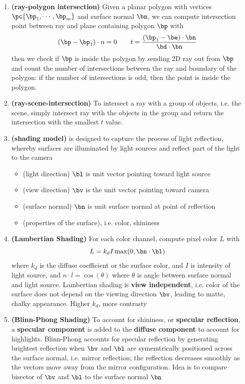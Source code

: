 \documentclass[11pt]{article}
\newcommand{\heading}[1]{(#1)}
\newcommand{\bheading}[1]{\textbf{(#1)}}
\begin{document}
\begin{enumerate}
    \item \bheading{ray-polygon intersection} Given a planar polygon with vertices $\pc{\bp_1, \cdots, \bp_m}$ and surface normal $\bn$, we can compute intersection point between ray and plane containing polygon $\bp$ with 
    \[
        (\bp - \bp_1) \cdot n = 0
        \quad \quad 
        t = \frac{(\bp_1 - \be) \cdot \bn}{\bd \cdot \bn}
    \]
    then we check if $\bp$ is inside the polygon by sending 2D ray out from $\bp$ and count the number of intersections between the ray and boundary of the polygon: if the number of intersections is odd, then the point is inside the polygon.
    \item \bheading{ray-scene-intersection} To intersect a ray with a group of objects, i.e. the scene, simply intersect ray with the objects in the group and return the intersection with the smallest $t$ value.
    \item \bheading{shading model} is designed to capture the process of light reflection, whereby surfaces are illuminated by light sources and reflect part of the light to the camera
    \begin{itemize}
        \item \heading{light direction} $\bl$ is unit vector pointing toward light source
        \item \heading{view direction} $\bv$ is the unit vector pointing toward camera
        \item \heading{surface normal} $\bn$ is unit surface normal at point of reflection
        \item \heading{properties of the surface}, i.e. color, shininess
    \end{itemize}
    \item \bheading{Lambertian Shading} For each color channel, compute pixel color $L$ with
    \[
        L = k_d I \max(0, \bn \cdot \bl)    
    \]
    where $k_d$ is the diffuse coefficient or the surface color, and $I$ is intensity of light source, and $n\cdot l = \cos(\theta)$ where $\theta$ is angle between surface normal and light source. Lambertian shading is \textbf{view independent}, i.e. color of the surface does not depend on the viewing direction $\bv$, leading to matte, chalky appearance. Higher $k_d$, more contrasty
    \item \bheading{Blinn-Phong Shading} To account for shininess, or \textbf{specular reflection}, a \textbf{specular component} is added to the \textbf{diffuse component} to account for highlights. Blinn-Phong accounts for specular reflection by generating brightest reflection when $\bv$ and $\bl$ are symemtrically positioned across the surface normal, i.e. mirror reflection; the reflection decreases smoothly as the vectors move away from the mirror configuration. Idea is to compare bisector of $\bv$ and $\bl$ to the surface normal $\bn$

\end{enumerate}
\end{document}
